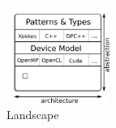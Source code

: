 \begin{figure}
\centerline{\includegraphics[width=0.3\textwidth]{img/Stack.png}}
\caption{Landscape}
\label{fig:stack}
\end{figure}

